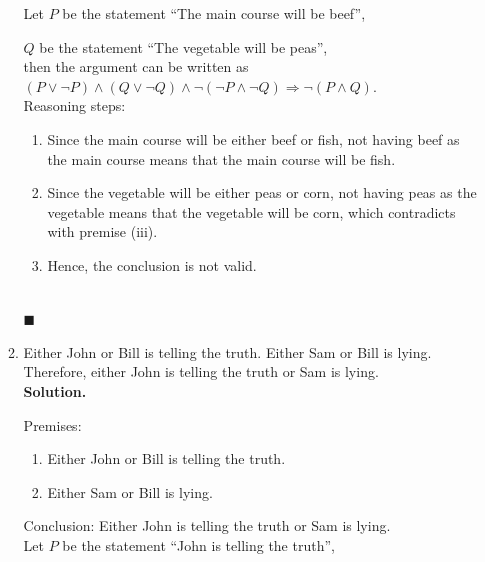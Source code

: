 \documentclass{report}
\newcommand{\sol}{\vspace{1em}\\\textbf{Solution.}\vspace{0.5em}}
\newcommand{\qed}{‎\\‎\hfill$\blacksquare$\vspace{1em}}
\begin{document}
\begin{enumerate}[leftmargin=*]
\begin{enumerate}
                        Let $P$ be the statement ``The main course will be beef'',

                        $Q$ be the statement ``The vegetable will be peas'',\\

                        then the argument can be written as $(P \vee \neg P) \wedge (Q \vee \neg Q)
                              \wedge \neg(\neg P \wedge \neg Q) \Rightarrow \neg(P \wedge Q)$.\\

                        Reasoning steps:
                        \begin{enumerate}
                              \item Since the main course will be either beef or fish, not having beef as the main
                                    course means that the main course will be fish.

                              \item Since the vegetable will be either peas or corn, not having peas as the
                                    vegetable means that the vegetable will be corn, which contradicts with premise
                                    (iii).

                              \item Hence, the conclusion is not valid.
                        \end{enumerate} \qed

                  \item Either John or Bill is telling the truth. Either Sam or Bill is lying.
                        Therefore, either John is telling the truth or Sam is lying. \sol{}

                        Premises:
                        \begin{enumerate}
                              \item Either John or Bill is telling the truth.
                              \item Either Sam or Bill is lying.
                        \end{enumerate}
                        \vspace{1em}
                        Conclusion: Either John is telling the truth or Sam is lying.\\

                        Let $P$ be the statement ``John is telling the truth'',


\end{enumerate}
\end{enumerate}
\end{document}

